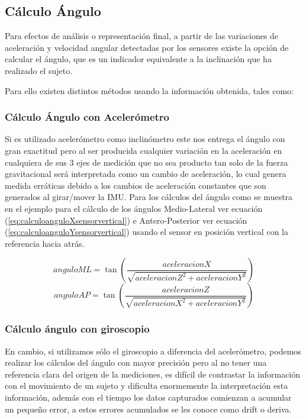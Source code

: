 \documentclass[12pt,a4paper]{article}
\begin{document}
\subsection{Cálculo Ángulo} 
Para efectos de análisis o representación final, a partir de las variaciones de aceleración y velocidad angular detectadas por los sensores existe la opción de calcular el ángulo, que es un indicador equivalente a la inclinación que ha realizado el sujeto.

Para ello existen distintos métodos usando la información obtenida, tales como:


\subsubsection{Cálculo Ángulo con Acelerómetro} Si es utilizado acelerómetro como inclinómetro este nos entrega el ángulo con gran exactitud pero al ser producida cualquier variación en la aceleración en cualquiera de sus 3 ejes de medición que no sea producto tan solo de la fuerza gravitacional será interpretada como un cambio de aceleración, lo cual genera medida erráticas debido a los cambios de aceleración constantes que son generados al girar/mover la IMU.
Para los cálculos del ángulo como se muestra en el ejemplo para el cálculo de los ángulos Medio-Lateral ver ecuación (\ref{eq:calculoanguloXsensorvertical}) e Antero-Posterior ver ecuación (\ref{eq:calculoanguloYsensorvertical}) usando el sensor en posición vertical con la referencia hacia atrás.

\begin{figure}[H]
	\begin{equation}
	anguloML = \tan{\left(\frac{aceleracionX}{\sqrt{aceleracionZ^{2}+aceleracionY^{2}}}\right)}
	\label{eq:calculoanguloXsensorvertical}
	\end{equation}
	\begin{equation}
	anguloAP = \tan{\left(\frac{aceleracionZ}{\sqrt{aceleracionX^{2}+aceleracionY^{2}}}\right)}
	\label{eq:calculoanguloYsensorvertical}
	\end{equation}
\end{figure}

\subsubsection{Cálculo ángulo con giroscopio} 
En cambio, si utilizamos sólo el giroscopio a diferencia del acelerómetro, podemos realizar los cálculos del ángulo con mayor precisión pero al no tener una referencia clara del origen de la mediciones, es difícil de contrastar la información con el movimiento de un sujeto y dificulta enormemente la  interpretación esta información, además con el tiempo los datos capturados comienzan a acumular un pequeño error, a estos errores acumulados se les conoce como drift o deriva.
\end{document}
